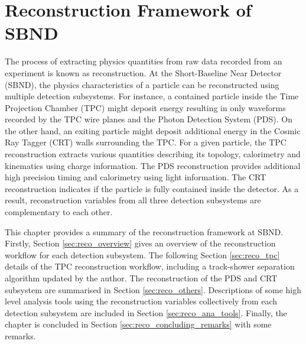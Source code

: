 
\chapter{Reconstruction Framework of SBND}
\label{ChapterReco}

\ifpdf
    \graphicspath{{Chapter6/Figs/Raster/}{Chapter6/Figs/PDF/}{Chapter6/Figs/}}
\else
    \graphicspath{{Chapter6/Figs/Vector/}{Chapter6/Figs/}}
\fi


The process of extracting physics quantities from raw data recorded from an experiment is known as reconstruction.
At the Short-Baseline Near Detector (SBND), the physics characteristics of a particle can be reconstructed using multiple detection subsystems. 
For instance, a contained particle inside the Time Projection Chamber (TPC) might deposit energy resulting in only waveforms recorded by the TPC wire planes and the Photon Detection System (PDS).
On the other hand, an exiting particle might deposit additional energy in the Cosmic Ray Tagger (CRT) walls surrounding the TPC.
For a given particle, the TPC reconstruction extracts various quantities describing its topology, calorimetry and kinematics using charge information.
The PDS reconstruction provides additional high precision timing and calorimetry using light information.
The CRT reconstruction indicates if the particle is fully contained inside the detector.
As a result, reconstruction variables from all three detection subsystems are complementary to each other. 

This chapter provides a summary of the reconstruction framework at SBND.
Firstly, Section \ref{sec:reco_overview} gives an overview of the reconstruction workflow for each detection subsystem. 
The following Section \ref{sec:reco_tpc} details of the TPC reconstruction workflow, including a track-shower separation algorithm updated by the author.
The reconstruction of the PDS and CRT subsystem are summarised in Section \ref{sec:reco_others}.
Descriptions of some high level analysis tools using the reconstruction variables collectively from each detection subsystem are included in Section \ref{sec:reco_ana_tools}.                 
Finally, the chapter is concluded in Section \ref{sec:reco_concluding_remarks} with some remarks.

